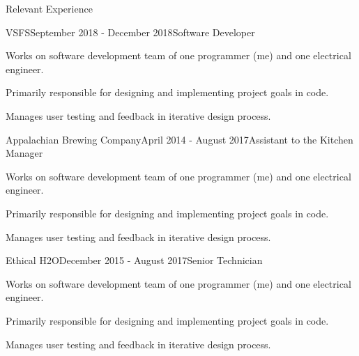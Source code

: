 \documentclass{resume} %
\begin{document}
\begin{rSection}{Relevant Experience}


\iffalse
\begin{rSubsection}{VSFS}{September 2018 - December 2018}{Software Developer}{}
\item Works on software development team of one programmer (me) and one electrical engineer.
\item Primarily responsible for designing and implementing project goals in code.
\item Manages user testing and feedback in iterative design process.
\end{rSubsection}


\begin{rSubsection}{Appalachian Brewing Company}{April 2014 - August 2017}{Assistant to the Kitchen Manager}{}
\item Works on software development team of one programmer (me) and one electrical engineer.
\item Primarily responsible for designing and implementing project goals in code.
\item Manages user testing and feedback in iterative design process.
\end{rSubsection}


\begin{rSubsection}{Ethical H2O}{December 2015 - August 2017}{Senior Technician}{}
\item Works on software development team of one programmer (me) and one electrical engineer.
\item Primarily responsible for designing and implementing project goals in code.
\item Manages user testing and feedback in iterative design process.
\end{rSubsection}


\end{rSection}
\end{document}
